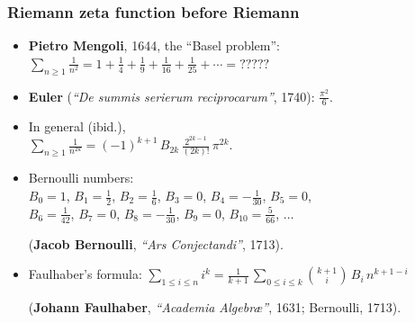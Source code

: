 \documentclass[handout]{beamer}
\newcommand{\personality}[1]{{\bf #1}}
\begin{document}

\begin{frame}
  \frametitle{Riemann zeta function before Riemann}

  \begin{itemize}
  \item<2-> \personality{Pietro Mengoli}, 1644, the ``Basel problem'':
    $\sum_{n \ge 1} \frac{1}{n^2} = 1 + \frac{1}{4} + \frac{1}{9} + \frac{1}{16} +\frac{1}{25} + \cdots = ?????$

  \item<3-> \personality{Euler}
    (\emph{``De summis serierum reciprocarum''}, 1740): $\frac{\pi^2}{6}$.

  \item<4-> In general (ibid.),\\
    $\sum_{n \ge 1} \frac{1}{n^{2k}} = (-1)^{k+1}\,B_{2k} \, \frac{2^{2k-1}}{(2k)!}\,\pi^{2k}$.

  \item<5-> Bernoulli numbers:\\
    $B_0 = 1$, $B_1 = \frac{1}{2}$, $B_2 = \frac{1}{6}$, $B_3 = 0$, $B_4 = -\frac{1}{30}$, $B_5 = 0$,\\
    $B_6 = \frac{1}{42}$, $B_7 = 0$, $B_8 = -\frac{1}{30}$, $B_9 = 0$, $B_{10} = \frac{5}{66}$, $\ldots$

    (\personality{Jacob Bernoulli}, \emph{``Ars Conjectandi''}, 1713).
    
  \item<6-> Faulhaber's formula:
    $\sum_{1\le i\le n} i^k = \frac{1}{k+1}\,\sum_{0 \le i \le k} {k+1\choose i}\,B_i\,n^{k+1-i}$

    (\personality{Johann Faulhaber}, \emph{``Academia Algebr\ae''}, 1631;
    Bernoulli, 1713).
  \end{itemize}
\end{frame}

\end{document}
